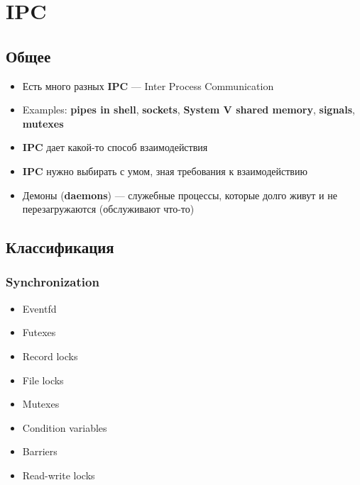 \documentclass[../../lectures.tex]{subfiles}
\begin{document}
\chapter{IPC}

\section{Общее}
\begin{itemize}
    \item Есть много разных \textbf{IPC} --- Inter Process Communication
    \item Examples: \textbf{pipes in shell}, \textbf{sockets}, \textbf{System V shared memory},
          \textbf{signals}, \textbf{mutexes}
    \item \textbf{IPC} дает какой-то способ взаимодействия
    \item \textbf{IPC} нужно выбирать с умом, зная требования к взаимодействию
    \item Демоны (\textbf{daemons}) --- служебные процессы, которые долго живут 
          и не перезагружаются (обслуживают что-то)
\end{itemize}

\section{Классификация}
\subsection{Synchronization}
\begin{itemize}
    \item Eventfd
    \item Futexes
    \item Record locks
    \item File locks
    \item Mutexes
    \item Condition variables
    \item Barriers
    \item Read-write locks
\end{itemize}
\end{document}
